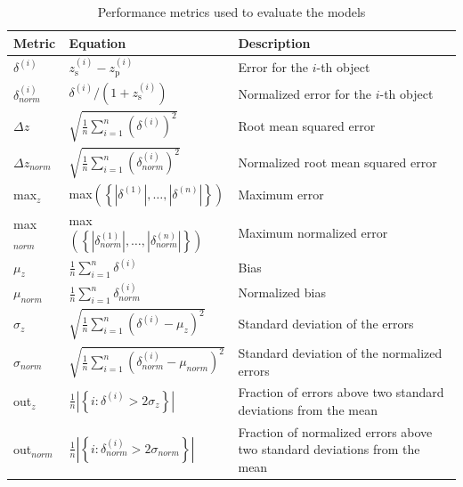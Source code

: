 \documentclass[useAMS,usenatbib,fleqn]{mn2e}
\begin{document}
 \begin{table}
 \caption{Performance metrics used to evaluate the models}
\begin{center}
  \begin{tabular}{| l | l | l |}
     	Metric				&	Equation	& Description\\	\hline
	$\delta^{\left(i\right)}$		&	$z_\textrm{s}^{\left(i\right)}-z_\textrm{p}^{\left(i\right)}	$		&  Error for the $i$-th object\\

	$\delta^{\left(i\right)}_{norm}$		&	$\delta^{\left(i\right)}/\left(1+z_\textrm{s}^{\left(i\right)}\right)$	&  Normalized error for the $i$-th object		\\

	$\Delta z$		&	$\sqrt{\frac{1}{n}\sum_{i=1}^{n}\left(\delta^{\left(i\right)}\right)^{2}}$	&  Root mean squared error		\\

	$\Delta z_{norm}$		&	$\sqrt{\frac{1}{n}\sum_{i=1}^{n}\left(\delta_{norm}^{\left(i\right)}\right)^{2}}$	&  Normalized root mean squared error		\\

	max$_{z}$	& max$\left(\left\{\left |\delta^{\left(1\right)}\right |,\hdots,\left |\delta^{\left(n\right)}\right |\right\}\right)$& Maximum error \\
	
	max$_{norm}$	& max$\left(\left\{\left |\delta_{norm}^{\left(1\right)}\right |,\hdots,\left |\delta_{norm}^{\left(n\right)}\right |\right\}\right)$& Maximum normalized error \\
	
	$\mu_{z}$		&	$\frac{1}{n}\sum_{i=1}^{n}\delta^{\left(i\right)}$	&  Bias		\\

	$\mu_{norm}$		&	$\frac{1}{n}\sum_{i=1}^{n}\delta_{norm}^{\left(i\right)}$	&  Normalized bias		\\

	$\sigma_{z}$		&	$\sqrt{\frac{1}{n}\sum_{i=1}^{n}\left(\delta^{\left(i\right)}-\mu_{z}\right)^{2}}$	&  Standard deviation of the errors		\\

	$\sigma_{norm}$		&	$\sqrt{\frac{1}{n}\sum_{i=1}^{n}\left(\delta_{norm}^{\left(i\right)}-\mu_{norm}\right)^{2}}$	&  Standard deviation of the normalized errors \\
	
	out$_{z}$		&	$\frac{1}{n}\left | \left\{i: \delta^{\left(i\right)}>2\sigma_{z}\right\}\right |$	&  Fraction of errors above two standard deviations from the mean \\
	out$_{norm}$		&	$\frac{1}{n}\left | \left\{i: \delta_{norm}^{\left(i\right)}>2\sigma_{norm}\right\}\right |$	&  Fraction of normalized errors above two standard deviations from the mean
	
  \end{tabular}
\end{center}
\label{table-metrics}
\end{table}
\end{document}
